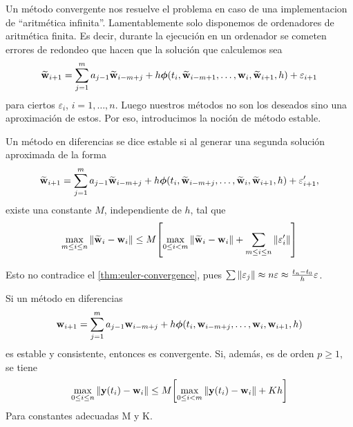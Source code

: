 Un método convergente nos resuelve el problema en caso de una
implementacion de ``aritmética infinita''.
Lamentablemente solo disponemos de ordenadores de aritmética finita.
Es decir, durante la ejecución en un ordenador se cometen errores de redondeo
que hacen que la solución que calculemos sea
\begin{equation*}
    \vb{\widetilde{w}}{}_{i+1} = \sum_{j=1}^m {a_{j-1}\vb{\widetilde{w}}{}_{i-m+j}}
        + h\vb*{\phi}{}(t_i,\vb{\widetilde{w}}{}_{i-m+1}, \dots, \vb{w}{}_i,\vb{\widetilde{w}}{}_{i+1},h) + \varepsilon_{i+1}
\end{equation*}
para ciertos $\varepsilon_i$, $i = 1,\ldots,n$.
Luego nuestros métodos no son los deseados sino una aproximación de estos.
Por eso, introducimos la noción de método estable.

\begin{definition}
    Un método en diferencias se dice estable
    si al generar una segunda solución aproximada de la forma
    \begin{equation*}
        \vb{\widetilde{w}}{}_{i+1} = \sum_{j=1}^m {a_{j-1}\vb{\widetilde{w}}{}_{i-m+j}}
            + h \vb*{\phi}{}(t_i,\vb{\widetilde{w}}{}_{i-m+j}, \dots, \vb{\widetilde{w}}{}_i,\vb{\widetilde{w}}{}_{i+1},h)
            + \varepsilon'_{i+1},
    \end{equation*}
    existe una constante $M$, independiente de $h$, tal que
    \begin{equation*} \label{stab}
        \max_{m \le i \le n}{\norm{\vb{\widetilde{w}}{}_i - \vb{w}{}_i}} \le M\qty[
            \max_{0 \le i < m}{\norm{\vb{\widetilde{w}}{}_i - \vb{w}{}_i}}
            + \sum_{m \le i \le n} \norm{\varepsilon'_i}
        ]
    \end{equation*}
\end{definition}

\begin{remark}
    Esto no contradice el \cref{thm:euler-convergence}, pues
    $\sum\norm{\varepsilon_j} \approx n\varepsilon \approx
    \frac{t_n - t_0}{h}\varepsilon$.
\end{remark}

\begin{theorem}
    Si un método en diferencias
    \begin{equation*}
        \vb{w}{}_{i+1} = \sum_{j=1}^m {a_{j-1}\vb{w}{}_{i-m+j}}
            + h\vb*{\phi}{}(t_i,\vb{w}{}_{i-m+j}, \dots, \vb{w}{}_i,\vb{w}{}_{i+1},h)
    \end{equation*}
    es estable y consistente, entonces es convergente.
    Si, además, es de orden $p \geq 1$, se tiene
    \begin{equation*}
        \max_{0 \le i \le n}\norm{\vb{y}{}(t_i) - \vb{w}{}_i} \le M\qty\bigg[
            \max_{0 \le i < m} \norm{\vb{y}{}(t_i) - \vb{w}{}_i} + Kh
            ]
    \end{equation*}
    Para constantes adecuadas M y K.
\end{theorem}

